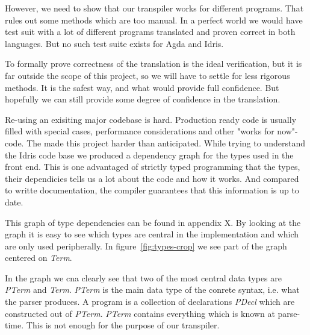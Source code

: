 
However, we need to show that our transpiler works for different programs.
That rules out some methods which are too manual.  In a perfect world we would
have test suit with a lot of different programs translated and proven correct in
both languages. But no such test suite exists for Agda and Idris.


To formally prove correctness of the translation is the ideal verification, but
it is far outside the scope of this project, so we will have to settle for less
rigorous methods. It is the safest way, and what would provide full confidence.
But hopefully we can still provide some degree of confidence in the
translation.





Re-using an exisiting major codebase is hard. Production ready code is usually
filled with special cases, performance considerations and other "works for
now"-code. The made this project harder than anticipated. While trying to
understand the Idris code base we produced a dependency graph for the types
used in the front end. This is one advantaged of strictly typed programming
that the types, their dependicies tells us a lot about the code and how it
works. And compared to writte documentation, the compiler guarantees that this
information is up to date.

\newcommand{\pterm}{\textit{PTerm}}
\newcommand{\pdecel}{\textit{PDecl}}
\newcommand{\term}{\textit{Term}}
\newcommand{\tti}{\textit{TT}}

This graph of type dependencies can be found in appendix X. By looking at the
graph it is easy to see which types are central in the implementation and which
are only used peripherally. In figure~\ref{fig:types-crop} we see part of the
graph centered on \textit{Term}.

In the graph we cna clearly see that two of the most central data types are
\textit{PTerm} and \textit{Term}. \textit{PTerm} is the main data type of the
conrete syntax, i.e. what the parser produces. A program is a collection of
declarations \textit{PDecl} which are constructed out of \pterm. \pterm
contains everything which is known at parse-time. This is not enough for the
purpose of our transpiler.

